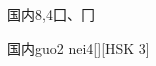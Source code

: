 \begin{entry}{国内}{8,4}{⼞、⼌}
  \begin{phonetics}{国内}{guo2 nei4}[][HSK 3]
  \end{phonetics}
\end{entry}
